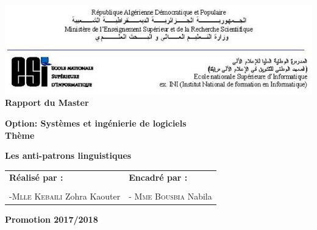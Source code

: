 
\begin{titlepage}
 \begin{center}
 \includegraphics[scale=0.9]{Others/Resources/entete.png}\\
 \vspace*{1cm}
  \LARGE
  \textbf{Rapport du Master\\}
  \large
 
  \LARGE
  	\vspace{2cm}
  \textbf{Option: Systèmes et ingénierie de logiciels}\\
  \vspace{1cm}
  \LARGE
  \textbf{Thème}\\
  \vspace{1cm}
  \LARGE
  \setlength{\fboxsep}{0.5cm}
  \begin{framed}
	\textbf{Les anti-patrons linguistiques}
  \end{framed}
  \vspace{2cm}
  \begin{table}[H]
   \setlength{\tabcolsep}{2cm}
    \large
	\centering
	\begin{tabular}{ll}
		\textbf{Réalisé par :}    
		 & \textbf{Encadré par : } \\  \\
		 -\textsc{Mlle Kebaili} Zohra Kaouter 
	
	& -\textsc{ Mme Bousbia} Nabila   \\
	

	\end{tabular}
  \end{table}
  \vspace{\fill}
  \large
  \textbf{Promotion 2017/2018}
        
 \end{center}
\end{titlepage}